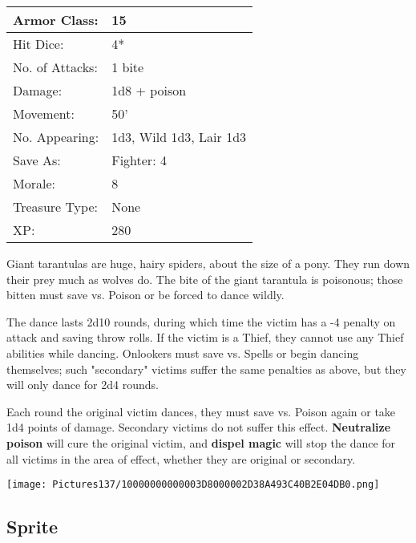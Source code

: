 \documentclass[a4paper,twoside,openany,10pt]{book}
\begin{document}
\begin{multicols}{2}
\begin{tabularx}{0.50\textwidth}{@{}lX@{}}
Armor Class: & 15 \\\hline
Hit Dice: & 4* \\\hline
No. of Attacks: & 1 bite \\\hline
Damage: & 1d8 + poison \\\hline
Movement: & 50' \\\hline
No. Appearing: & 1d3, Wild 1d3, Lair 1d3 \\\hline
Save As: & Fighter: 4 \\\hline
Morale: & 8 \\\hline
Treasure Type: & None \\\hline
XP: & 280 \\\hline
\end{tabularx}\medskip

Giant tarantulas are huge, hairy spiders, about the size of a pony. They run down their prey much as wolves do. The bite of the giant tarantula is poisonous; those bitten must save vs. Poison or be forced to dance wildly. 

The dance lasts 2d10 rounds, during which time the victim has a -4 penalty on attack and saving throw rolls. If the victim is a Thief, they cannot use any Thief abilities while dancing. Onlookers must save vs. Spells or begin dancing themselves; such "secondary" victims suffer the same penalties as above, but they will only dance for 2d4 rounds.

Each round the original victim dances, they must save vs. Poison again or take 1d4 points of damage. Secondary victims do not suffer this effect. \textbf{Neutralize poison} will cure the original victim, and \textbf{dispel magic} will stop the dance for all victims in the area of effect, whether they are original or secondary.

\vfill

\begin{center} \texttt{[image: Pictures137/10000000000003D8000002D38A493C40B2E04DB0.png]} \end{center}

\columnbreak

\subsection*{Sprite}\label{sprite}


\end{multicols}
\end{document}
